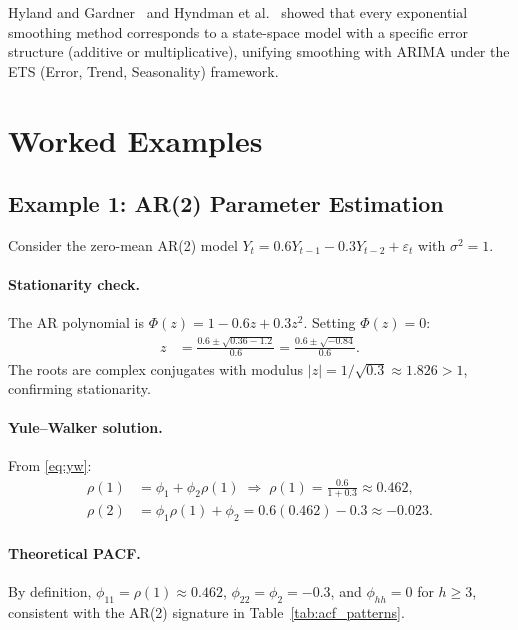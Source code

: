 \documentclass[conference]{IEEEtran}
\theoremstyle{definition}
\begin{document}
Hyland and Gardner~\cite{gardner1985exponential} and Hyndman
et al.~\cite{hyndman2008forecasting} showed that every exponential smoothing
method corresponds to a state-space model with a specific error structure
(additive or multiplicative), unifying smoothing with ARIMA under the
ETS (Error, Trend, Seasonality) framework.

\section{Worked Examples}
\label{sec:examples}

\subsection{Example 1: AR(2) Parameter Estimation}

Consider the zero-mean AR(2) model $Y_t = 0.6Y_{t-1} - 0.3Y_{t-2} + \varepsilon_t$
with $\sigma^2 = 1$.

\paragraph{Stationarity check.}
The AR polynomial is $\Phi(z) = 1 - 0.6z + 0.3z^2$. Setting $\Phi(z) = 0$:
\begin{align*}
  z &= \frac{0.6 \pm \sqrt{0.36 - 1.2}}{0.6}
     = \frac{0.6 \pm \sqrt{-0.84}}{0.6}.
\end{align*}
The roots are complex conjugates with modulus
$|z| = 1/\sqrt{0.3} \approx 1.826 > 1$,
confirming stationarity.

\paragraph{Yule--Walker solution.}
From \eqref{eq:yw}:
\begin{align*}
  \rho(1) &= \phi_1 + \phi_2\rho(1) \;\Rightarrow\; \rho(1) = \frac{0.6}{1+0.3} \approx 0.462,\\
  \rho(2) &= \phi_1\rho(1) + \phi_2 = 0.6(0.462) - 0.3 \approx -0.023.
\end{align*}

\paragraph{Theoretical PACF.}
By definition, $\phi_{11} = \rho(1) \approx 0.462$,
$\phi_{22} = \phi_2 = -0.3$, and $\phi_{hh} = 0$ for $h \geq 3$,
consistent with the AR(2) signature in Table~\ref{tab:acf_patterns}.
\end{document}
